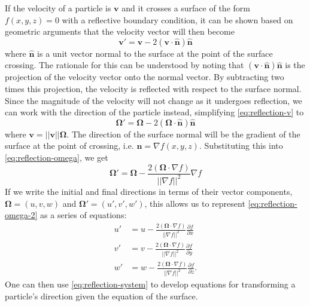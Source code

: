If the velocity of a particle is $\mathbf{v}$ and it crosses a surface of
the form $f(x,y,z) = 0$ with a reflective boundary condition, it can be
shown based on geometric arguments that the velocity vector will then become
\begin{equation}
  \label{eq:reflection-v}
  \mathbf{v'} = \mathbf{v} - 2 (\mathbf{v} \cdot \hat{\mathbf{n}})
  \hat{\mathbf{n}}
\end{equation}
where $\hat{\mathbf{n}}$ is a unit vector normal to the surface at the point of
the surface crossing. The rationale for this can be understood by noting that
$(\mathbf{v} \cdot \hat{\mathbf{n}}) \hat{\mathbf{n}}$ is the projection of the
velocity vector onto the normal vector. By subtracting two times this
projection, the velocity is reflected with respect to the surface normal. Since
the magnitude of the velocity will not change as it undergoes reflection, we can
work with the direction of the particle instead, simplifying
\eqref{eq:reflection-v} to
\begin{equation}
  \label{eq:reflection-omega}
  \mathbf{\Omega'} = \mathbf{\Omega} - 2 (\mathbf{\Omega} \cdot
  \hat{\mathbf{n}}) \hat{\mathbf{n}}
\end{equation}
where $\mathbf{v} = || \mathbf{v} || \mathbf{\Omega}$. The direction of the
surface normal will be the gradient of the surface at the point of crossing,
i.e. $\mathbf{n} = \nabla f(x,y,z)$. Substituting this into
\eqref{eq:reflection-omega}, we get
\begin{equation}
  \label{eq:reflection-omega-2}
  \mathbf{\Omega'} = \mathbf{\Omega} - \frac{2 ( \mathbf{\Omega} \cdot \nabla
    f )}{|| \nabla f ||^2} \nabla f
\end{equation}
If we write the initial and final directions in terms of their vector
components, $\mathbf{\Omega} = (u,v,w)$ and $\mathbf{\Omega'} = (u', v', w')$,
this allows us to represent \eqref{eq:reflection-omega-2} as a series of
equations:
\begin{equation}
  \label{eq:reflection-system}
  \begin{split}
    u' &= u - \frac{2 ( \mathbf{\Omega} \cdot \nabla f )}{|| \nabla f ||^2}
    \frac{\partial f}{\partial x} \\
    v' &= v - \frac{2 ( \mathbf{\Omega} \cdot \nabla f )}{|| \nabla f ||^2}
    \frac{\partial f}{\partial y} \\
    w' &= w - \frac{2 ( \mathbf{\Omega} \cdot \nabla f )}{|| \nabla f ||^2}
    \frac{\partial f}{\partial z}.
  \end{split}
\end{equation}
One can then use \eqref{eq:reflection-system} to develop equations for
transforming a particle's direction given the equation of the surface.

